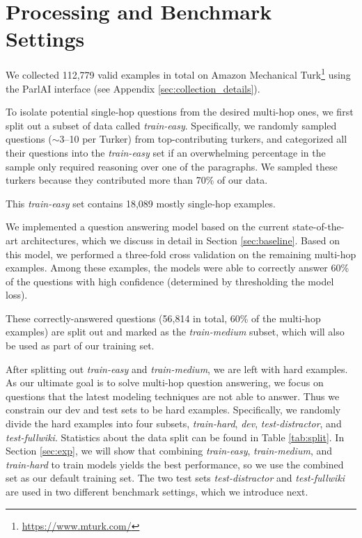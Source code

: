 \section{Processing and Benchmark Settings}

We collected 112,779 valid examples in total on Amazon Mechanical Turk\footnote{\url{https://www.mturk.com/}} using the ParlAI interface \cite{miller2017parlai} (see Appendix \ref{sec:collection_details}).

To isolate potential single-hop questions from the desired multi-hop ones, we first split out a subset of data called \textit{train-easy}.
Specifically, we randomly sampled questions ($\sim$3--10 per Turker) from top-contributing turkers, and categorized all their questions into the \textit{train-easy} set if an overwhelming percentage in the sample only required reasoning over one of the paragraphs. We sampled these turkers because they contributed more than 70\% of our data.

This \textit{train-easy} set contains 18,089 mostly single-hop examples.

We implemented a question answering model based on the current state-of-the-art architectures, which we discuss in detail in Section \ref{sec:baseline}.
Based on this model, we performed a three-fold cross validation on the remaining multi-hop examples. Among these examples, the models were able to correctly answer 60\% of the questions with high confidence (determined by thresholding the model loss).

These correctly-answered questions (56,814 in total, 60\% of the multi-hop examples) are split out and marked as the \textit{train-medium} subset, which will also be used as part of our training set.

After splitting out \textit{train-easy} and \textit{train-medium}, we are left with hard examples. As our ultimate goal is to solve multi-hop question answering, we focus on questions that the latest modeling techniques are not able to answer. Thus we constrain our dev and test sets to be hard examples. Specifically, we randomly divide the hard examples into four subsets, \textit{train-hard}, \textit{dev}, \textit{test-distractor}, and \textit{test-fullwiki}.
Statistics about the data split can be found in Table \ref{tab:split}. In Section \ref{sec:exp}, we will show that combining \textit{train-easy}, \textit{train-medium}, and \textit{train-hard} to train models yields the best performance, so we use the combined set as our default training set. The two test sets \textit{test-distractor} and \textit{test-fullwiki} are used in two different benchmark settings, which we introduce next.

